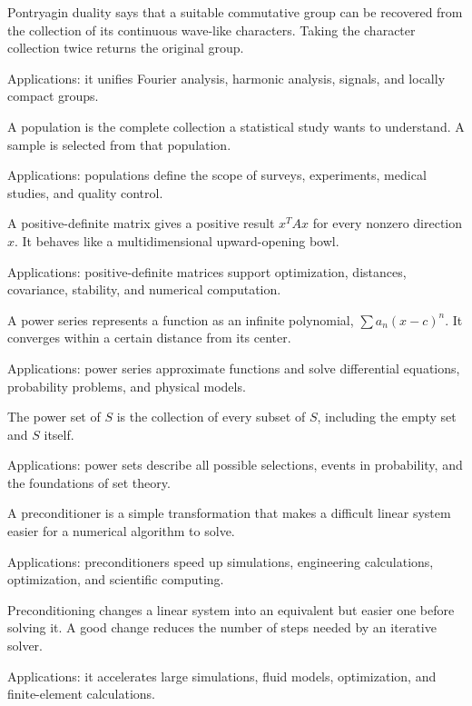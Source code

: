 Pontryagin duality says that a suitable commutative group can be recovered from the collection of its continuous wave-like characters. Taking the character collection twice returns the original group. \par\noindent Applications: it unifies Fourier analysis, harmonic analysis, signals, and locally compact groups.

A population is the complete collection a statistical study wants to understand. A sample is selected from that population. \par\noindent Applications: populations define the scope of surveys, experiments, medical studies, and quality control.

A positive-definite matrix gives a positive result $x^TAx$ for every nonzero direction $x$. It behaves like a multidimensional upward-opening bowl. \par\noindent Applications: positive-definite matrices support optimization, distances, covariance, stability, and numerical computation.

A power series represents a function as an infinite polynomial, $\sum a_n(x-c)^n$. It converges within a certain distance from its center. \par\noindent Applications: power series approximate functions and solve differential equations, probability problems, and physical models.

The power set of $S$ is the collection of every subset of $S$, including the empty set and $S$ itself. \par\noindent Applications: power sets describe all possible selections, events in probability, and the foundations of set theory.

A preconditioner is a simple transformation that makes a difficult linear system easier for a numerical algorithm to solve. \par\noindent Applications: preconditioners speed up simulations, engineering calculations, optimization, and scientific computing.

Preconditioning changes a linear system into an equivalent but easier one before solving it. A good change reduces the number of steps needed by an iterative solver. \par\noindent Applications: it accelerates large simulations, fluid models, optimization, and finite-element calculations.

